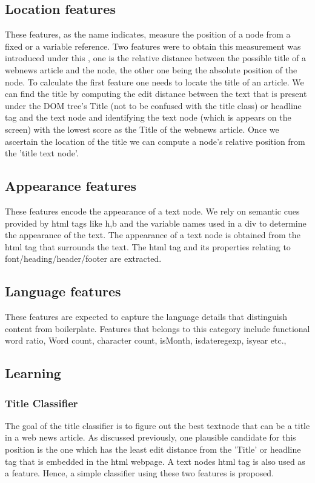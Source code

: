 \documentclass{article} %
\begin{document}
\subsection{Location features}
These features, as the name indicates, measure the position of a node from a fixed or a variable reference. Two features were to obtain this measurement was introduced under this , one is the relative distance between the possible title of a webnews article and the node, the other one being the absolute position of the node. To calculate the first feature one needs to locate the title of an article. We can find the title by computing the edit distance between the text that is present under the DOM tree's Title  (not to be confused with the title class) or headline tag and the text node and identifying the text node (which is appears on the screen) with the lowest score as the Title of the webnews article. Once we ascertain the location of the title we can compute a node's relative position from the 'title text node'.

\subsection{Appearance features}
These features encode the appearance of a text node. We rely on semantic cues provided by html tags like h,b and the variable names used in a div to determine the appearance of the text. The appearance of a text node is obtained from the html tag that surrounds the text. The html tag and its properties relating to font/heading/header/footer are extracted.


\subsection{Language features}
These features are expected to capture the language details that distinguish content from boilerplate. Features that belongs to this category include functional word ratio, Word count, character count, isMonth, isdateregexp, isyear etc.,

\subsection{Learning}
\subsubsection{Title Classifier}
The goal of the title classifier is to figure out the best textnode that can be a title in a web news article. As discussed previously, one plausible candidate for this position is the one which has the least edit distance from the 'Title' or headline tag that is embedded in the html webpage. A text nodes html tag is also used as a feature. Hence, a simple classifier using these two features is proposed.
\end{document}
